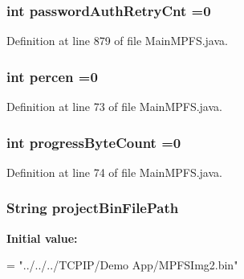 \subsubsection[{password\+Auth\+Retry\+Cnt}]{\setlength{\rightskip}{0pt plus 5cm}int password\+Auth\+Retry\+Cnt =0}\label{class_microchip_m_p_f_s_1_1_main_m_p_f_s_ae483b74d95985e21e780c8421fcef770}


Definition at line 879 of file Main\+M\+P\+F\+S.\+java.

\hypertarget{class_microchip_m_p_f_s_1_1_main_m_p_f_s_a4deb75764e195abd8142ff2e75a3f5bf}{}
\subsubsection[{percen}]{\setlength{\rightskip}{0pt plus 5cm}int percen =0}\label{class_microchip_m_p_f_s_1_1_main_m_p_f_s_a4deb75764e195abd8142ff2e75a3f5bf}


Definition at line 73 of file Main\+M\+P\+F\+S.\+java.

\hypertarget{class_microchip_m_p_f_s_1_1_main_m_p_f_s_ad93aeeb304f4c0e3a132cb35bc95a562}{}
\subsubsection[{progress\+Byte\+Count}]{\setlength{\rightskip}{0pt plus 5cm}int progress\+Byte\+Count =0}\label{class_microchip_m_p_f_s_1_1_main_m_p_f_s_ad93aeeb304f4c0e3a132cb35bc95a562}


Definition at line 74 of file Main\+M\+P\+F\+S.\+java.

\hypertarget{class_microchip_m_p_f_s_1_1_main_m_p_f_s_a5c13397b795504abe1cc4d4661c40c5f}{}
\subsubsection[{project\+Bin\+File\+Path}]{\setlength{\rightskip}{0pt plus 5cm}String project\+Bin\+File\+Path}\label{class_microchip_m_p_f_s_1_1_main_m_p_f_s_a5c13397b795504abe1cc4d4661c40c5f}
{\bfseries Initial value\+:}
\begin{DoxyCode}
=
            \textcolor{stringliteral}{"../../../TCPIP/Demo App/MPFSImg2.bin"}
\end{DoxyCode}


